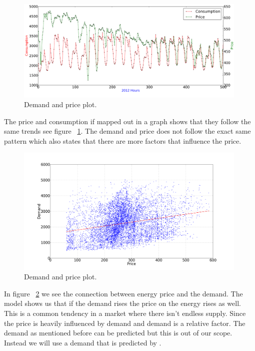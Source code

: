 \begin{figure}[H]
\centering
\includegraphics[width=0.99\textwidth ]{billeder/energy_price_plots/price_consump_graph.png}
\caption{Demand and price plot.}
\label{fig:consump_price_graph}
\end{figure}

The price and consumption if mapped out in a graph shows that they follow the same trends see figure ~\ref{fig:consump_price_graph}. The demand and price does not follow the exact same pattern which also states that there are more factors that influence the price.

\begin{figure}[H]
\centering
\includegraphics[width=0.99\textwidth ]{billeder/energy_price_plots/consump_price.png}
\caption{Demand and price plot.}
\label{fig:consump_price}
\end{figure}

In figure ~\ref{fig:consump_price} we see the connection between energy price and the demand. The model shows us that if the demand rises the price on the energy rises as well. This is a common tendency in a market where there isn't endless supply. Since the price is heavily influenced by demand and demand is a relative factor. The demand as mentioned before can be predicted but this is out of our scope. Instead we will use a demand that is predicted by .

